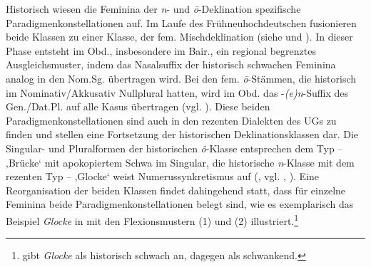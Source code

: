 Historisch wiesen die Feminina der {\textit{n}}{{}-} und {\textit{ō}}{{}-Deklination} spezifische Paradigmenkonstellationen auf. Im Laufe des Frühneuhochdeutschen fusionieren beide Klassen zu einer Klasse, der fem. Mischdeklination (siehe 	 und ). In dieser Phase entsteht im Obd., insbesondere im Bair., ein regional begrenztes Ausgleichsmuster, indem das Nasalsuffix der historisch schwachen Feminina analog in den Nom.Sg. übertragen wird. Bei den fem. \textit{ō}{}-Stämmen, die historisch im Nominativ/Akkusativ Nullplural hatten, wird im Obd. das -\textit{(e)n}{}-Suffix des Gen./Dat.Pl. auf alle Kasus übertragen (vgl. \citealt[83]{KleinEtAl2018}). Diese beiden Paradigmenkonstellationen sind auch in den rezenten Dialekten des UGs zu finden und stellen eine Fortsetzung der historischen Deklinationsklassen dar. Die Singular- und Pluralformen der historischen \textit{ô}{}-Klasse entsprechen dem Typ  --  ‚Brücke‘ mit apokopiertem Schwa im Singular, die historische \textit{n}{}-Klasse mit dem rezenten Typ  --  ‚Glocke‘ weist Numerussynkretismus auf (, vgl. \citealt[§29.2]{Köhler1934}, \citealt[§35]{Schübel1955}). Eine Reorganisation der beiden Klassen findet dahingehend statt, dass für einzelne Feminina beide Paradigmenkonstellationen belegt sind, wie es exemplarisch das Beispiel \textit{Glocke} in 	 mit den Flexionsmustern (1) und (2) illustriert.\footnote{\citet[§44]{Paul1968} gibt \textit{Glocke} als historisch schwach an, \citet{Lexer1872-1878} dagegen als schwankend.}


